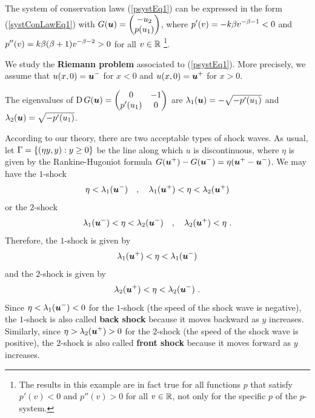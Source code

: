 \begin{egg}  \label{eggPsystem2}
The system of conservation laws (\ref{psystEq1}) can be expressed in
the form (\ref{systConLawEq1}) with
$\displaystyle G({\bm{u}}) = \begin{pmatrix} -u_2 \\ p(u_1) \end{pmatrix}$,
where $\displaystyle p'(v) = -k\beta v^{-\beta-1} <0$ and
$\displaystyle p''(v) = k\beta(\beta+1) v^{-\beta-2} >0$ for all $v \in \mathbb{R}$
\footnote{The results in this example are in fact true for all
functions $p$ that satisfy $p'(v) < 0$ and $p''(v) > 0$ for all $v \in \mathbb{R}$,
not only for the specific $p$ of the $p$-system.}.

We study the {\bfseries Riemann problem} associated to (\ref{psystEq1}).  More
precisely, we assume that $\displaystyle u(x,0) = {\bm{u}}^-$ for $x<0$ and
$\displaystyle u(x,0) = {\bm{u}}^+$ for $x>0$.

The eigenvalues of
$\displaystyle \operatorname{D} G({\bm{u}}) = \begin{pmatrix} 0 & -1 \\
p'(u_1) & 0 \end{pmatrix}$ are
$\lambda_1({\bm{u}}) = -\sqrt{-p'(u_1)}$ and
$\lambda_2({\bm{u}}) = \sqrt{-p'(u_1)}$.

According to our theory, there are two acceptable types of shock
waves.  As usual, let
$\displaystyle \Gamma = \left\{ (\eta y,y) : y \geq 0 \right\}$
be the line along which $u$ is discontinuous, where $\eta$ is given
by the Rankine-Hugoniot formula
$\displaystyle G({\bm{u}}^+) - G({\bm{u}}^-)
= \eta ({\bm{u}}^+ - {\bm{u}}^-)$.  We may have the $1$-shock
\[
\eta < \lambda_1({\bm{u}}^-) \quad , \quad
\lambda_1({\bm{u}}^+) <  \eta < \lambda_2({\bm{u}}^+)
\]
or the $2$-shock
\[
\lambda_1({\bm{u}}^-) <  \eta < \lambda_2({\bm{u}}^-)
\quad , \quad \lambda_2({\bm{u}}^+) <  \eta \ .
\]
Therefore, the $1$-shock is given by
\begin{equation} \label{psystEq2}
\lambda_1({\bm{u}}^+) < \eta < \lambda_1({\bm{u}}^-)
\end{equation}
and the $2$-shock is given by
\begin{equation} \label{psystEq3}
\lambda_2({\bm{u}}^+) < \eta < \lambda_2({\bm{u}}^-) \ .
\end{equation}
Since $\displaystyle \eta < \lambda_1({\bm{u}}^-) < 0$ for the $1$-shock
(the speed of the shock wave is negative), the $1$-shock is also called
{\bfseries back shock}
because it moves backward as $y$ increases.
Similarly, since $\displaystyle \eta > \lambda_2({\bm{u}}^+) > 0$ for the
$2$-shock (the speed of the shock wave is positive),
the $2$-shock is also called
{\bfseries front shock}
because it moves forward as $y$ increases.


\end{egg}
